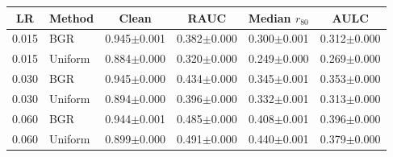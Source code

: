 \begin{tabular}{clcccc}
\hline
LR & Method & Clean & RAUC & Median $r_{80}$ & AULC \\
\hline
0.015 & BGR & 0.945$\pm$0.001 & 0.382$\pm$0.000 & 0.300$\pm$0.001 & 0.312$\pm$0.000 \\
0.015 & Uniform & 0.884$\pm$0.000 & 0.320$\pm$0.000 & 0.249$\pm$0.000 & 0.269$\pm$0.000 \\
0.030 & BGR & 0.945$\pm$0.000 & 0.434$\pm$0.000 & 0.345$\pm$0.001 & 0.353$\pm$0.000 \\
0.030 & Uniform & 0.894$\pm$0.000 & 0.396$\pm$0.000 & 0.332$\pm$0.001 & 0.313$\pm$0.000 \\
0.060 & BGR & 0.944$\pm$0.001 & 0.485$\pm$0.000 & 0.408$\pm$0.001 & 0.396$\pm$0.000 \\
0.060 & Uniform & 0.899$\pm$0.000 & 0.491$\pm$0.000 & 0.440$\pm$0.001 & 0.379$\pm$0.000 \\
\hline
\end{tabular}
